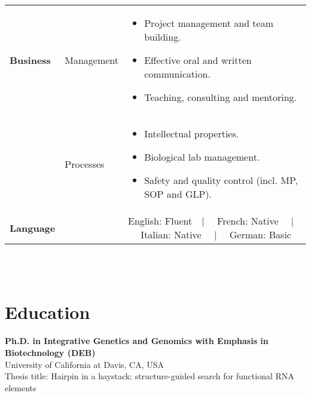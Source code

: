 \documentclass{CV}
\begin{document}
\begin{tabular}{p{} p{} p{}}
\textbf{Business} & 
	Management &
		\begin{itemize}\setlength\itemsep{-0.5em}
		\vspace{-1.8em}
		\item Project management and team building.
		\item Effective oral and written communication.
		\item Teaching, consulting and mentoring.
		\end{itemize}\\
& 
	Processes &
		\begin{itemize}\setlength\itemsep{-0.5em}
		\vspace{-1.8em}
		\item Intellectual properties.
		\item Biological lab management.
		\item Safety and quality control (incl. MP, SOP and GLP).
		\end{itemize}\\
\textbf{Language} && English: Fluent~~|~~ French: Native ~~|~~ Italian: Native ~~|~~ German: Basic\\
\end{tabular}
\\\\






\section*{Education}
\textbf{Ph.D. in  Integrative Genetics and Genomics with Emphasis in Biotechnology (DEB)}\\
University of California at Davis, CA, USA \hfill {}\\
Thesis title: Hairpin in a haystack: structure-guided search for functional RNA elements\\
\end{document}

